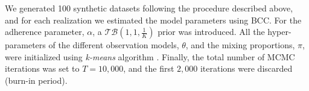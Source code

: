 We generated 100 synthetic datasets following the procedure described above, and for each realization we estimated the model parameters using BCC. For the adherence parameter, $\alpha$, a $\mathcal{TB}(1, 1, \frac{1}{K})$ prior was introduced. All the hyper-parameters of the different observation models, $\theta$, and the mixing proportions, $\pi$, were initialized using \emph{k-means} algorithm \citep{MacQueen1967}. Finally, the total number of MCMC iterations was set to $T=10,000$, and the first $2,000$ iterations were discarded (\ie burn-in period). 